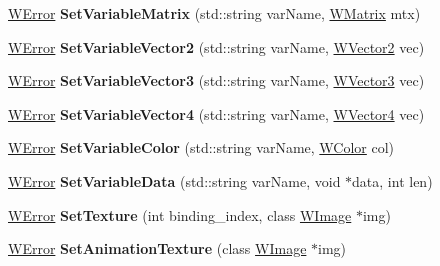 \begin{DoxyCompactItemize}
\item 
\hyperlink{class_w_error}{W\+Error} {\bfseries Set\+Variable\+Matrix} (std\+::string var\+Name, \hyperlink{class_w_matrix}{W\+Matrix} mtx)\hypertarget{class_w_material_a2449e4c84b0178d4a17dbf3c38b65bc0}{}\label{class_w_material_a2449e4c84b0178d4a17dbf3c38b65bc0}

\item 
\hyperlink{class_w_error}{W\+Error} {\bfseries Set\+Variable\+Vector2} (std\+::string var\+Name, \hyperlink{class_w_vector2}{W\+Vector2} vec)\hypertarget{class_w_material_a292db3323499ff88c90d0520b7a1f37e}{}\label{class_w_material_a292db3323499ff88c90d0520b7a1f37e}

\item 
\hyperlink{class_w_error}{W\+Error} {\bfseries Set\+Variable\+Vector3} (std\+::string var\+Name, \hyperlink{class_w_vector3}{W\+Vector3} vec)\hypertarget{class_w_material_a6657ad5aad5e928e779630f8c7f5c982}{}\label{class_w_material_a6657ad5aad5e928e779630f8c7f5c982}

\item 
\hyperlink{class_w_error}{W\+Error} {\bfseries Set\+Variable\+Vector4} (std\+::string var\+Name, \hyperlink{class_w_vector4}{W\+Vector4} vec)\hypertarget{class_w_material_a588327bcc22a2f15c194956ae7fef5f5}{}\label{class_w_material_a588327bcc22a2f15c194956ae7fef5f5}

\item 
\hyperlink{class_w_error}{W\+Error} {\bfseries Set\+Variable\+Color} (std\+::string var\+Name, \hyperlink{class_w_color}{W\+Color} col)\hypertarget{class_w_material_a198f6c0646136cac167dd512d7e7a6d9}{}\label{class_w_material_a198f6c0646136cac167dd512d7e7a6d9}

\item 
\hyperlink{class_w_error}{W\+Error} {\bfseries Set\+Variable\+Data} (std\+::string var\+Name, void $\ast$data, int len)\hypertarget{class_w_material_a2542310d912de3c3953dac8e9c269960}{}\label{class_w_material_a2542310d912de3c3953dac8e9c269960}

\item 
\hyperlink{class_w_error}{W\+Error} {\bfseries Set\+Texture} (int binding\+\_\+index, class \hyperlink{class_w_image}{W\+Image} $\ast$img)\hypertarget{class_w_material_a4936e1d25fd3ecce6fbef960eeb75fdf}{}\label{class_w_material_a4936e1d25fd3ecce6fbef960eeb75fdf}

\item 
\hyperlink{class_w_error}{W\+Error} {\bfseries Set\+Animation\+Texture} (class \hyperlink{class_w_image}{W\+Image} $\ast$img)\hypertarget{class_w_material_a02d31133d0c88cd8def56318bb69ff90}{}\label{class_w_material_a02d31133d0c88cd8def56318bb69ff90}


\end{DoxyCompactItemize}
